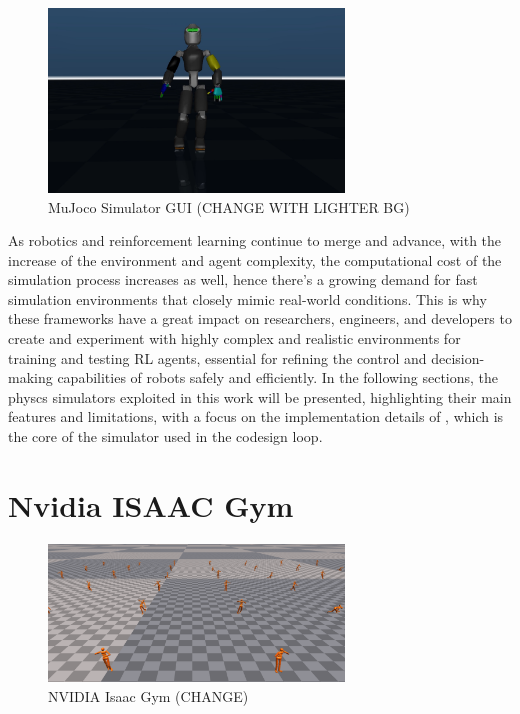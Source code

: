 \begin{figure}
    \centering
    \caption{MuJoco Simulator GUI (CHANGE WITH LIGHTER BG)}
    \label{fig:mujoco}
    \includegraphics[width=0.7\textwidth]{Images/mujoco_ergocub.png}
\end{figure}

As robotics and reinforcement learning continue to merge and advance, with the increase of the environment and agent complexity, the computational cost of the simulation process increases as well, hence there's a growing demand for fast simulation environments that closely mimic real-world conditions. This is why these frameworks have a great impact on researchers, engineers, and developers to create and experiment with highly complex and realistic environments for training and testing \ac{RL} agents, essential for refining the control and decision-making capabilities of robots safely and efficiently. In the following sections, the physcs simulators exploited in this work will be presented, highlighting their main features and limitations, with a focus on the implementation details of \jax, which is the core of the simulator used in the codesign loop.

\section{Nvidia ISAAC Gym}

\begin{figure}
    \centering
    \caption{NVIDIA Isaac Gym (CHANGE)}
    \label{fig:isaac_gym}
    \includegraphics[width=0.7\textwidth]{Images/isaacgym_humanoid.png}
\end{figure}

